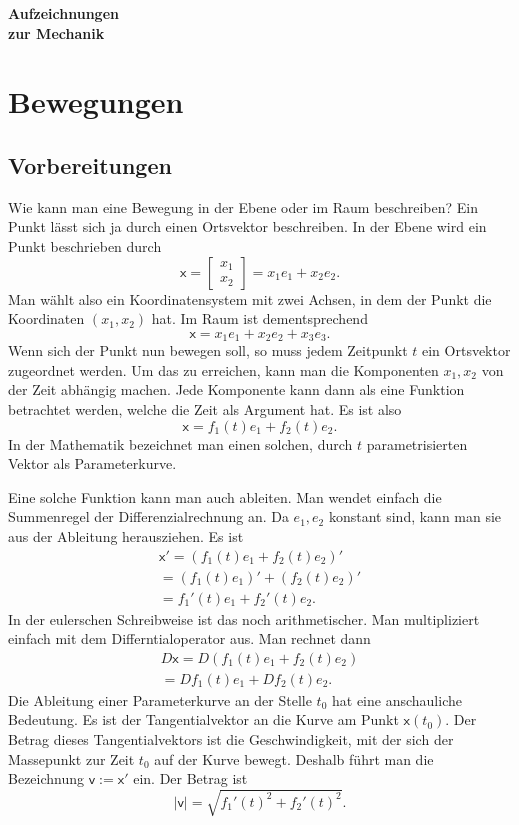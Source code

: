 \documentclass[a4paper,11pt,fleqn,twocolumn,twoside,dvipdfmx]{scrartcl}
\newcommand{\bvec}[1]{\bm{\mathsf{#1}}}
\begin{document}
\thispagestyle{empty}

\begin{huge}
\noindent
\textbf{Aufzeichnungen\\
zur Mechanik}
\par
\end{huge}
\vspace{1em}

\tableofcontents

\section{Bewegungen}

\subsection{Vorbereitungen}

Wie kann man eine Bewegung in der Ebene oder im Raum beschreiben?
Ein Punkt lässt sich ja durch einen Ortsvektor beschreiben. In der
Ebene wird ein Punkt beschrieben durch%
\[\bvec x
= \begin{bmatrix}x_1\\ x_2\end{bmatrix}
= x_1e_1+x_2e_2.\]
Man wählt also ein Koordinatensystem mit zwei Achsen, in dem der
Punkt die Koordinaten $(x_1,x_2)$ hat. Im Raum ist dementsprechend%
\[\bvec x = x_1e_1+x_2e_2+x_3e_3.\]
Wenn sich der Punkt nun bewegen soll, so muss jedem Zeitpunkt $t$
ein Ortsvektor zugeordnet werden. Um das zu erreichen, kann man die
Komponenten $x_1,x_2$ von der Zeit abhängig machen. Jede Komponente
kann dann als eine Funktion betrachtet werden, welche die Zeit als
Argument hat. Es ist also%
\[\bvec x = f_1(t)e_1+f_2(t)e_2.\]
In der Mathematik bezeichnet man einen solchen, durch $t$
parametrisierten Vektor als Parameterkurve.

Eine solche Funktion kann man auch ableiten. Man wendet einfach die
Summenregel der Differenzialrechnung an. Da $e_1,e_2$ konstant sind,
kann man sie aus der Ableitung herausziehen. Es ist%
\begin{gather*}
\bvec x' = (f_1(t)e_1+f_2(t)e_2)'\\
= (f_1(t)e_1)'+(f_2(t)e_2)'\\
= f_1'(t)e_1+f_2'(t)e_2.
\end{gather*}
In der eulerschen Schreibweise ist das noch arithmetischer.
Man multipliziert einfach mit dem Differntialoperator aus.
Man rechnet dann%
\begin{gather*}
D\bvec x = D(f_1(t)e_1+f_2(t)e_2)\\
= Df_1(t)e_1+Df_2(t)e_2.
\end{gather*}
Die Ableitung einer Parameterkurve an der Stelle $t_0$ hat eine
anschauliche Bedeutung. Es ist der Tangentialvektor an die Kurve
am Punkt $\bvec x(t_0)$. Der Betrag dieses Tangentialvektors
ist die Geschwindigkeit, mit der sich der Massepunkt zur Zeit $t_0$
auf der Kurve bewegt. Deshalb führt man die Bezeichnung
$\bvec v:=\bvec x'$ ein. Der Betrag ist%
\[|\bvec v| = \sqrt{f_1'(t)^2+f_2'(t)^2}.\]
\end{document}

